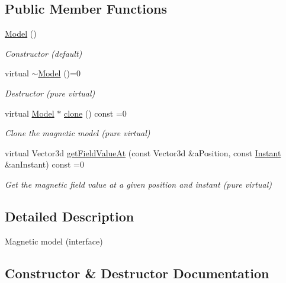 \subsection*{Public Member Functions}
\begin{DoxyCompactItemize}
\item 
\hyperlink{classostk_1_1physics_1_1environment_1_1magnetic_1_1_model_a50d6421402d4f67aa9c45e9be5f27d30}{Model} ()
\begin{DoxyCompactList}\small\item\em Constructor (default) \end{DoxyCompactList}\item 
virtual \hyperlink{classostk_1_1physics_1_1environment_1_1magnetic_1_1_model_a6fe1b73447dc65989d31db636fa73953}{$\sim$\+Model} ()=0
\begin{DoxyCompactList}\small\item\em Destructor (pure virtual) \end{DoxyCompactList}\item 
virtual \hyperlink{classostk_1_1physics_1_1environment_1_1magnetic_1_1_model}{Model} $\ast$ \hyperlink{classostk_1_1physics_1_1environment_1_1magnetic_1_1_model_af357908c151a7809bbbc8fc676bd07b6}{clone} () const =0
\begin{DoxyCompactList}\small\item\em Clone the magnetic model (pure virtual) \end{DoxyCompactList}\item 
virtual Vector3d \hyperlink{classostk_1_1physics_1_1environment_1_1magnetic_1_1_model_abf0510f9be2c196ea3c0586d02979b0f}{get\+Field\+Value\+At} (const Vector3d \&a\+Position, const \hyperlink{classostk_1_1physics_1_1time_1_1_instant}{Instant} \&an\+Instant) const =0
\begin{DoxyCompactList}\small\item\em Get the magnetic field value at a given position and instant (pure virtual) \end{DoxyCompactList}\end{DoxyCompactItemize}


\subsection{Detailed Description}
Magnetic model (interface) 

\subsection{Constructor \& Destructor Documentation}
\mbox{\label{classostk_1_1physics_1_1environment_1_1magnetic_1_1_model_a50d6421402d4f67aa9c45e9be5f27d30}} 
